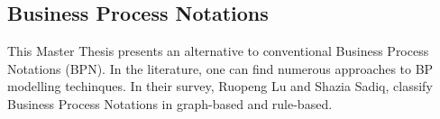 

\subsection{Business Process Notations}




This Master Thesis presents an alternative to conventional Business Process
Notations (BPN). In the literature, one can find numerous approaches to BP modelling
techinques. In their survey\cite{10.1007/978-3-540-72035-5_7}, Ruopeng Lu and
Shazia Sadiq, classify Business Process Notations in graph-based and rule-based.


